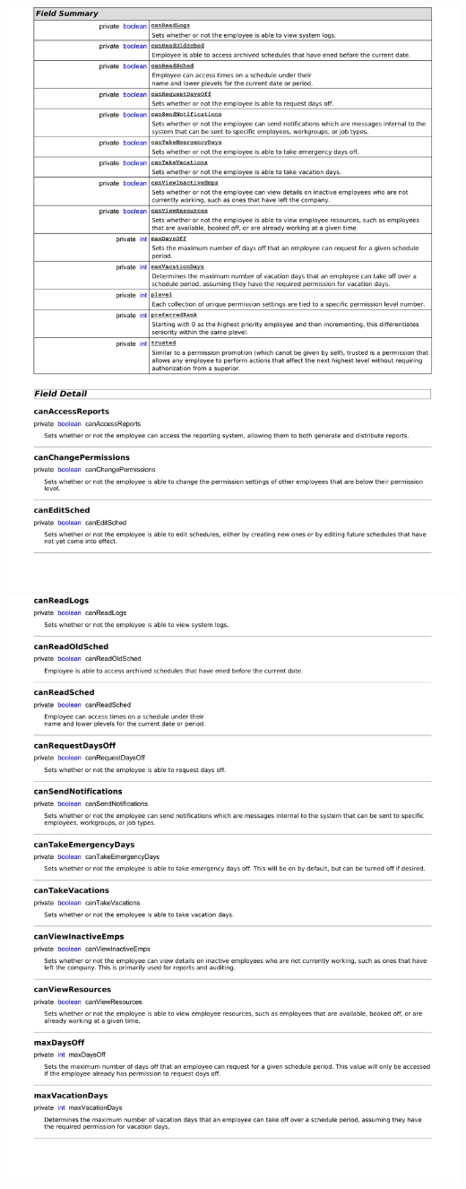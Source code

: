 \documentclass[letterpaper,12pt]{report}
\begin{document}
\newpage
\includegraphics[scale=0.9,trim=20mm 30mm 25mm 8mm]{externals/db6.pdf}
\newpage
\includegraphics[scale=0.9,trim=20mm 30mm 25mm 8mm]{externals/db7.pdf}
\end{document}
